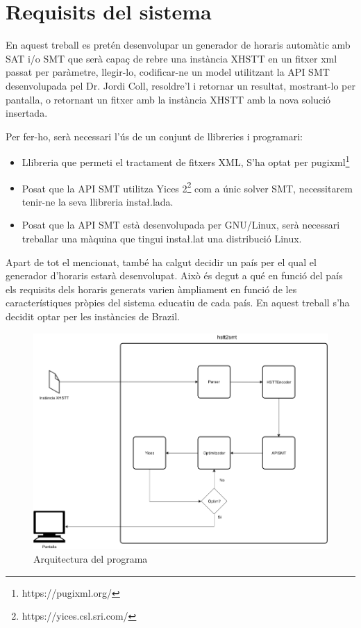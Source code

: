 \documentclass[11pt,a4paper,twoside]{report}
\begin{document}
  





  \chapter{Requisits del sistema}

  En aquest treball es pretén desenvolupar un generador de horaris automàtic 
  amb SAT i/o SMT que serà capaç de rebre una instància XHSTT en un fitxer xml passat per paràmetre, 
  llegir-lo, codificar-ne un model utilitzant la API SMT desenvolupada pel Dr. Jordi Coll, resoldre'l i retornar un resultat, mostrant-lo per pantalla, o retornant un fitxer amb la instància XHSTT amb la nova solució insertada.

  Per fer-ho, serà necessari l'ús de un conjunt de llibreries i programari:

  \begin{itemize}
    \item Llibreria que permeti el tractament de fitxers XML, S'ha optat per pugixml\footnote{https://pugixml.org/}
    \item Posat que la API SMT utilitza Yices 2\footnote{https://yices.csl.sri.com/} com a únic solver SMT, necessitarem tenir-ne la seva llibreria insta\l.lada.
    \item Posat que la API SMT està desenvolupada per GNU/Linux, serà necessari treballar una màquina que tingui insta\l.lat una distribució Linux.
  \end{itemize}
  
  Apart de tot el mencionat, també ha calgut decidir un país per el qual el generador d'horaris estarà desenvolupat. Això és degut a qué en funció del país els requisits dels horaris generats varien àmpliament en funció de les característiques pròpies del sistema educatiu de cada país.
  En aquest treball s'ha decidit optar per les instàncies de Brazil.
 
 \begin{figure}[ht!]
  \includegraphics[width=\textwidth]{Diagrames/Arqui1.png}
  \caption{Arquitectura del programa}
  \label{fig:Arqui1}
\end{figure}
 
\end{document}
